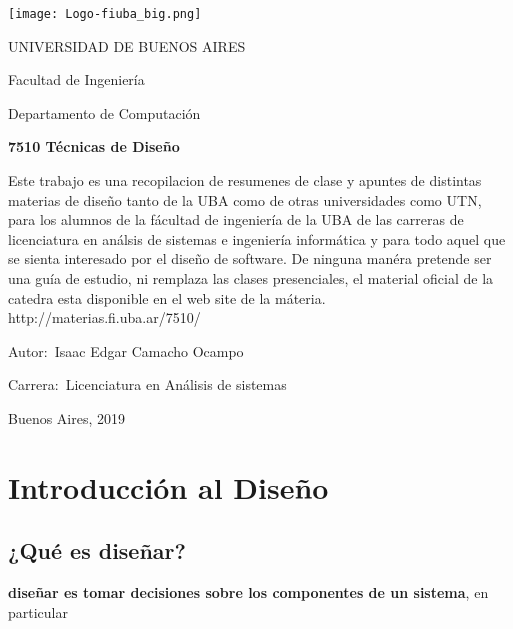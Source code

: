 \documentclass[12pt]{book}
\begin{document}
\thispagestyle{empty}

\begin {center}

\texttt{[image: Logo-fiuba\_big.png]}

\medskip
UNIVERSIDAD DE BUENOS AIRES

Facultad de Ingenier\'ia

Departamento de Computaci\'on


\vspace{3cm}


\textbf{\large 7510 T\'ecnicas de Diseño}

\vspace{2cm}


Este trabajo es una recopilacion de resumenes de clase y apuntes de distintas materias de diseño tanto de la UBA como de otras universidades como UTN, para los alumnos de la f\'acultad de ingenier\'ia  de la UBA de las carreras de licenciatura en an\'alsis de sistemas e ingenier\'ia inform\'atica y para todo aquel que se sienta interesado por el diseño de software.
De ninguna man\'era pretende ser una gu\'ia de estudio, ni remplaza las clases presenciales, el material oficial de la catedra esta disponible en el web site de la m\'ateria.
\\
http://materias.fi.uba.ar/7510/

\end {center}


\vspace{2.5cm}

\noindent Autor:\,	Isaac Edgar Camacho Ocampo
 
\noindent Carrera:\,	Licenciatura en An\'alisis de sistemas

\vspace{1cm}

\vspace{1cm}

\noindent Buenos Aires, 2019

\newpage


\tableofcontents

\chapter{Introducción al Diseño}
\section{¿Qué es diseñar?}
\textbf{diseñar es tomar decisiones sobre los componentes de un sistema}, en particular
\end{document}
